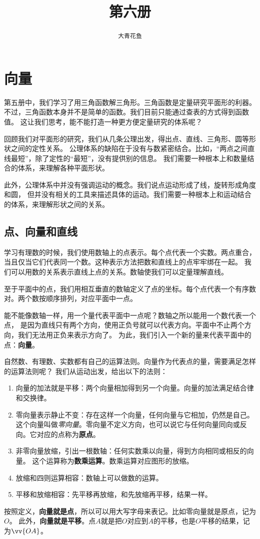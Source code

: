 \documentclass[12pt,UTF8]{ctexbook}
\title{\zihao{0} \bfseries 第六册}
\author{\zihao{2} \texttt{大青花鱼}}
\date{}
\begin{document}
\maketitle
\tableofcontents
\newpage

\chapter{向量}
第五册中，我们学习了用三角函数解三角形。三角函数是定量研究平面形的利器。
不过，三角函数本身并不是简单的函数。我们目前只能通过查表的方式得到函数值。
这让我们思考，能不能打造一种更方便定量研究的体系呢？

回顾我们对平面形的研究，我们从几条公理出发，得出点、直线、三角形、圆等形状之间的定性关系。
公理体系的缺陷在于没有与数紧密结合。比如，“两点之间直线最短”，除了定性的“最短”，没有提供别的信息。
我们需要一种根本上和数量结合的体系，来理解各种平面形状。

此外，公理体系中并没有强调运动的概念。我们说点运动形成了线，旋转形成角度和圆，
但并没有相关的工具来描述具体的运动。我们需要一种根本上和运动结合的体系，来理解形状之间的关系。

\section{点、向量和直线}
学习有理数的时候，我们使用数轴上的点表示。每个点代表一个实数。两点重合，
当且仅当它们代表同一个数。这种表示方法把数和直线上的点牢牢绑在一起。
我们可以用数的关系表示直线上点的关系。数轴使我们可以定量理解直线。

至于平面中的点，我们用相互垂直的数轴定义了点的坐标。每个点代表一个有序数对。两个数按顺序排列，对应平面中一点。

能不能像数轴一样，用一个量代表平面中一点呢？数轴之所以能用一个数代表一个点，
是因为直线只有两个方向，使用正负号就可以代表方向。平面中不止两个方向，我们无法用正负来表示方向了。
为此，我们引入一个新的量来代表平面中的点：\textbf{向量}。

自然数、有理数、实数都有自己的运算法则。向量作为代表点的量，需要满足怎样的运算法则呢？
我们从运动出发，给出以下的法则：
\begin{enumerate}
    \item 向量的加法就是平移：两个向量相加得到另一个向量。向量的加法满足结合律和交换律。
    \item 零向量表示静止不变：存在这样一个向量，任何向量与它相加，仍然是自己。
    这个向量叫做\textsl{零向量}。零向量不定义方向，也可以说它与任何向量同向或反向。它对应的点称为\textbf{原点}。
    \item 非零向量放缩，引出一根数轴：任何实数乘以向量，得到方向相同或相反的向量。
    这个运算称为\textbf{数乘运算}。数乘运算对应图形的放缩。
    \item 放缩和四则运算相容：数轴上可以做数的运算。
    \item 平移和放缩相容：先平移再放缩，和先放缩再平移，结果一样。
\end{enumerate}
按照定义，\textbf{向量就是点}，所以可以用大写字母来表记。比如零向量就是原点，记为$O$。
此外，\textbf{向量就是平移}。点$A$就是把$O$对应到$A$的平移，也是$O$平移的结果，记为$\vv{OA}$。
\end{document}
